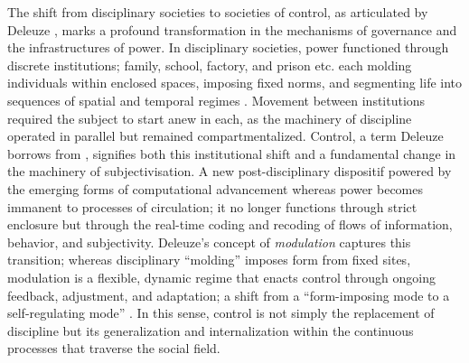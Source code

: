 
The shift from disciplinary societies to societies of control, as articulated by Deleuze \parencite{deleuze1995a}, marks a profound transformation in the mechanisms of governance and the infrastructures of power. In disciplinary societies, power functioned through discrete institutions; family, school, factory, and prison etc. each molding individuals within enclosed spaces, imposing fixed norms, and segmenting life into sequences of spatial and temporal regimes \parencite[4]{deleuze1992a}. Movement between institutions required the subject to start anew in each, as the machinery of discipline operated in parallel but remained compartmentalized. Control, a term Deleuze borrows from \citeauthor{burroughs1979} \parencite*[]{burroughs1979}, signifies both this institutional shift and a fundamental change in the machinery of subjectivisation. A new post-disciplinary dispositif powered by the emerging forms of computational advancement whereas power becomes immanent to processes of circulation; it no longer functions through strict enclosure but through the real-time coding and recoding of flows of information, behavior, and subjectivity. Deleuze’s concept of \textit{modulation} captures this transition; whereas disciplinary “molding” imposes form from fixed sites, modulation is a flexible, dynamic regime that enacts control through ongoing feedback, adjustment, and adaptation; a shift from a “form-imposing mode to a self-regulating mode” \parencite[74]{hui2015}. In this sense, control is not simply the replacement of discipline but its generalization and internalization within the continuous processes that traverse the social field.

